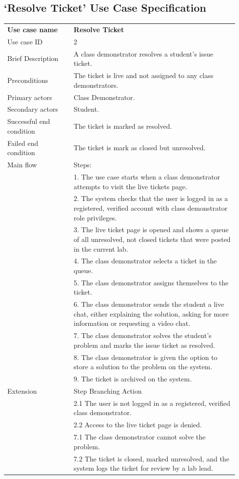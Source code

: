 \subsection*{`Resolve Ticket' Use Case Specification}
\begin{table}[H]
\centering
 \begin{tabular}{p{0.27\linewidth}  p{0.67\linewidth}}
 \textbf{Use case name} & \textbf{Resolve Ticket}  \\
 Use case ID & 2\\
 Brief Description & A class demonstrator resolves a student's issue ticket.\\
 Preconditions & The ticket is live and not assigned to any class demonstrators.\\
 Primary actors & Class Demonstrator. \\
 Secondary actors & Student. \\
 Successful end condition & The ticket is marked as resolved. \\
 Failed end condition & The ticket is mark as closed but unresolved. \\
 Main flow & Steps:\\
 & 1. The use case starts when a class demonstrator attempts to visit the live tickets page.\\
 & 2. The system checks that the user is logged in as a registered, verified account with class demonstrator role privileges. \\
 & 3. The live ticket page is opened and shows a queue of all unresolved, not closed tickets that were posted in the current lab. \\
 & 4. The class demonstrator selects a ticket in the queue.\\
 & 5. The class demonstrator assigns themselves to the ticket. \\
 & 6. The class demonstrator sends the student a live chat, either explaining the solution, asking for more information or requesting a video chat. \\
 & 7. The class demonstrator solves the student's problem and marks the issue ticket as resolved. \\
 & 8. The class demonstrator is given the option to store a solution to the problem on the system.\\
 & 9. The ticket is archived on the system.\\

 Extension & Step\hspace{0.3cm} Branching Action \\
 & 2.1 \hspace{0.5cm}The user is not logged in as a registered, verified class demonstrator. \\
 & 2.2 \hspace{0.5cm}Access to the live ticket page is denied. \\
 & 7.1 \hspace{0.5cm} The class demonstrator cannot solve the problem.\\
 & 7.2 \hspace{0.5cm} The ticket is closed, marked unresolved, and the system logs the ticket for review by a lab lead.\\
  

\end{tabular}
\end{table}
